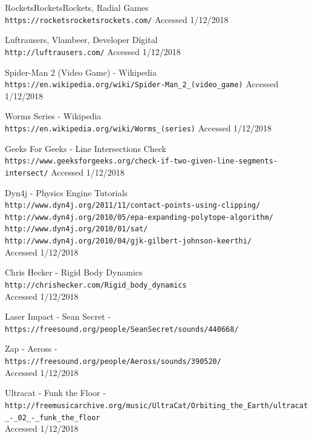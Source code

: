 \documentclass[10pt,a4paper]{article}
\begin{document}
\begin{thebibliography}{9}
 
RocketsRocketsRockets, Radial Games
\\\texttt{https://rocketsrocketsrockets.com/}
Accessed 1/12/2018

Luftrausers, Vlambeer, Developer Digital
\\\texttt{http://luftrausers.com/}
Accessed 1/12/2018

Spider-Man 2 (Video Game) - Wikipedia
\\\texttt{https://en.wikipedia.org/wiki/Spider-Man\_2\_(video\_game)}
Accessed 1/12/2018

Worms Series - Wikipedia
\\\texttt{https://en.wikipedia.org/wiki/Worms\_(series)}
Accessed 1/12/2018

Geeks For Geeks - Line Intersections Check
\\\texttt{https://www.geeksforgeeks.org/check-if-two-given-line-segments-intersect/}
Accessed 1/12/2018

Dyn4j - Physics Engine Tutorials
\\\texttt{http://www.dyn4j.org/2011/11/contact-points-using-clipping/}
\\\texttt{http://www.dyn4j.org/2010/05/epa-expanding-polytope-algorithm/}
\\\texttt{http://www.dyn4j.org/2010/01/sat/}
\\\texttt{http://www.dyn4j.org/2010/04/gjk-gilbert-johnson-keerthi/}
\\Accessed 1/12/2018

Chris Hecker - Rigid Body Dynamics
\\\texttt{http://chrishecker.com/Rigid\_body\_dynamics}
\\Accessed 1/12/2018

Laser Impact - Sean Secret - \\\texttt{https://freesound.org/people/SeanSecret/sounds/440668/}

Zap - Aeross - \\\texttt{https://freesound.org/people/Aeross/sounds/390520/}
\\Accessed 1/12/2018

Ultracat - Funk the Floor - \\\texttt{http://freemusicarchive.org/music/UltraCat/Orbiting\_the\_Earth/ultracat\_-\_02\_-\_funk\_the\_floor}
\\Accessed 1/12/2018


\end{thebibliography}
\end{document}
